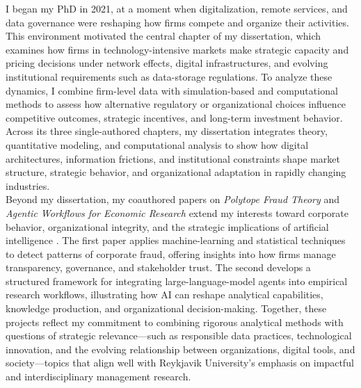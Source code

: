\documentclass{nfr}
\begin{document}
I began my PhD in 2021, at a moment when digitalization, remote services, and data governance were reshaping how firms compete and organize their activities. 
This environment motivated the central chapter of my dissertation, which examines how firms in technology-intensive markets make strategic capacity and pricing decisions under network effects, digital infrastructures, and evolving institutional requirements such as data-storage regulations. 
To analyze these dynamics, I combine firm-level data with simulation-based and computational methods to assess how alternative regulatory or organizational choices influence competitive outcomes, strategic incentives, and long-term investment behavior. 
Across its three single-authored chapters, my dissertation integrates theory, quantitative modeling, and computational analysis to show how digital architectures, information frictions, and institutional constraints shape market structure, strategic behavior, and organizational adaptation in rapidly changing industries.\\

Beyond my dissertation, my coauthored papers on \textit{Polytope Fraud Theory} and \textit{Agentic Workflows for Economic Research} extend my interests toward corporate behavior, organizational integrity, and the strategic implications of artificial intelligence \citep{Zhao2025, Dawid2025}. 
The first paper applies machine-learning and statistical techniques to detect patterns of corporate fraud, offering insights into how firms manage transparency, governance, and stakeholder trust. 
The second develops a structured framework for integrating large-language-model agents into empirical research workflows, illustrating how AI can reshape analytical capabilities, knowledge production, and organizational decision-making. 
Together, these projects reflect my commitment to combining rigorous analytical methods with questions of strategic relevance—such as responsible data practices, technological innovation, and the evolving relationship between organizations, digital tools, and society—topics that align well with Reykjavik University's emphasis on impactful and interdisciplinary management research.\\
\end{document}
